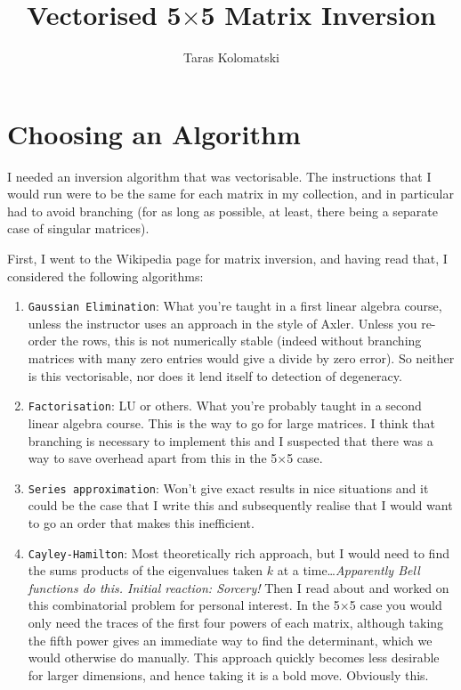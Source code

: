 \documentclass{amsart}
\title{Vectorised 5$\times$5 Matrix Inversion \vspace{-0.65cm}}
\date{Taras Kolomatski}
\begin{document}
\maketitle

\section*{Choosing an Algorithm}

I needed an inversion algorithm that was vectorisable. The instructions that I would run were to be the same for each matrix in my collection, and in particular had to avoid branching (for as long as possible, at least, there being a separate case of singular matrices).

First, I went to the Wikipedia page for matrix inversion, and having read that, I considered the following algorithms:

\begin{enumerate}
    \item \texttt{Gaussian Elimination}: What you're taught in a first linear algebra course, unless the instructor uses an approach in the style of Axler. Unless you re-order the rows, this is not numerically stable (indeed without branching matrices with many zero entries would give a divide by zero error). So neither is this vectorisable, nor does it lend itself to detection of degeneracy.
    \item \texttt{Factorisation}: LU or others. What you're probably taught in a second linear algebra course. This is the way to go for large matrices. I think that branching is necessary to implement this and I suspected that there was a way to save overhead apart from this in the 5$\times$5 case.
    \item \texttt{Series approximation}: Won't give exact results in nice situations and it could be the case that I write this and subsequently realise that I would want to go an order that makes this inefficient.
    \item \texttt{Cayley-Hamilton}: Most theoretically rich approach, but I would need to find the sums products of the eigenvalues taken $k$ at a time\ldots \textit{Apparently Bell functions do this. Initial reaction: Sorcery!} Then I read about and worked on this combinatorial problem for personal interest. In the 5$\times$5 case you would only need the traces of the first four powers of each matrix, although taking the fifth power gives an immediate way to find the determinant, which we would otherwise do manually. This approach quickly becomes less desirable for larger dimensions, and hence taking it is a bold move. Obviously this.
\end{enumerate}
\end{document}
